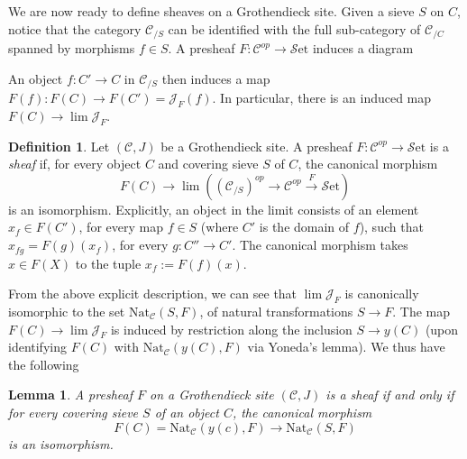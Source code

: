 \documentclass[10pt]{amsart}
\newcommand{\C}{\mathscr{C}}
\newcommand{\set}{\mathscr{S}\mathrm{et}}
\newcommand{\Nat}{\mathrm{Nat}}
\newtheorem{lemma}[equation]{Lemma}
\theoremstyle{definition}
\newtheorem{definition}[equation]{Definition}
\theoremstyle{remark}
\begin{document}
	We are now ready to define sheaves on a Grothendieck site. Given a sieve $S$ on $C$, notice that the category $\C_{/S}$ can be identified with the full sub-category of $\C_{/C}$ spanned by morphisms $f\in S$. A presheaf $F\colon \C^{op}\to\set$ induces a diagram 
	\begin{center}
	\end{center}An object $f\colon C'\to C$ in $\C_{/S}$ then induces a map $F(f)\colon F(C)\to F(C')=\mathscr J_F(f)$. In particular, there is an induced map $F(C)\to\lim\mathscr J_F$.  
	\begin{definition}
		Let $(\C, J)$ be a Grothendieck site. A {presheaf} $F : \C^{op} \to \set$ is a \emph{sheaf} if, for every object $C$ and covering sieve $S$ of $C$, the canonical morphism
		\[ F(C) \to \lim((\C_{/S})^{op}\to\C^{op}\xrightarrow F\set)\]
		is an isomorphism. Explicitly, an object in the limit consists of an element $x_f\in F(C')$, for every map $f\in S$ (where $C'$ is the domain of $f$), such that $x_{fg}=F(g)(x_f)$, for every $g\colon C''\to C'$. The canonical morphism takes $x\in F(X)$ to the tuple $x_f:=F(f)(x)$. 
	\end{definition}From the above explicit description, we can see that $\lim\mathscr J_F$ is canonically isomorphic to the set $\Nat_\C(S,F)$, of natural transformations $S\to F$. The map $F(C)\to\lim\mathscr J_F$ is induced by restriction along the inclusion $S\to y(C)$ (upon identifying $F(C)$ with $\Nat_\C(y(C),F)$ via Yoneda's lemma). We thus have the following
	\begin{lemma}
		A presheaf $F$ on a Grothendieck site $(\C, J)$ is a sheaf if and only if for every covering sieve $S$ of an object $C$, the canonical morphism
		\[ F(C)  = \Nat_\C(y(c),F)\to \Nat_\C(S,F) \]
		is an isomorphism. 
	\end{lemma}
	
\end{document}
